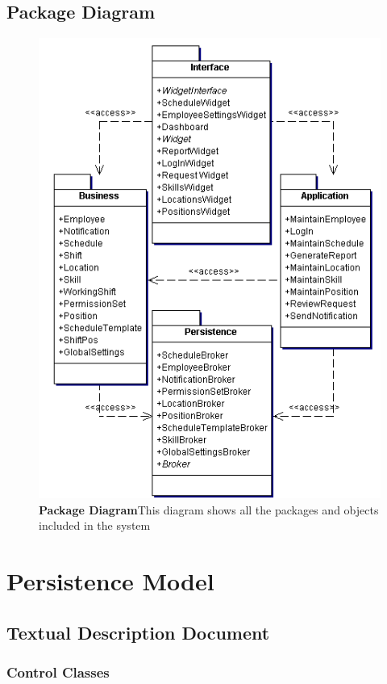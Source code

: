 \documentclass[letterpaper,12pt]{report}
\begin{document}
\section{Package Diagram}
\pagebreak
\begin{figure}[packageDiagram]
 \centering
 \includegraphics[scale=0.8]{externals/PackageDiagram.png}
 \caption{\small
\textbf{Package Diagram}\newline This diagram shows all the packages and objects included in the system }\label{fig:packageDiagram}
\end{figure}

\chapter{Persistence Model}
\section{Textual Description Document}
\subsection*{Control Classes}
\end{document}
